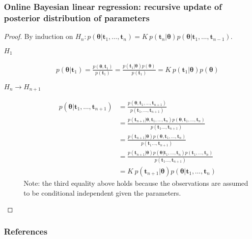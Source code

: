 \documentclass{beamer}
\begin{document}
\begin{frame}
    \frametitle{Online Bayesian linear regression: recursive update of posterior distribution of parameters}
	\tiny
	\begin{proof}
		By induction on $H_n: p(\boldsymbol{\theta}|\mathbf{t}_1,\ldots,\mathbf{t}_n)=K\ p(\mathbf{t}_n|\boldsymbol{\theta})p(\boldsymbol{\theta}|\mathbf{t}_1,\ldots,\mathbf{t}_{n-1})$.
		\begin{description}
			\item[$H_1$]
				\begin{align*}
					p(\boldsymbol{\theta}|\mathbf{t}_1)=\frac{p(\boldsymbol{\theta},\mathbf{t}_1)}{p(\mathbf{t}_1)}=\frac{p(\mathbf{t}_1|\boldsymbol{\theta})p(\boldsymbol{\theta})}{p(\mathbf{t}_1)}=K\ p(\mathbf{t}_1|\boldsymbol{\theta})p(\boldsymbol{\theta})
				\end{align*}
			\item[$H_n\rightarrow H_{n+1}$]
				\begin{align*}
					p(\boldsymbol{\theta}|\mathbf{t}_1,\ldots,\mathbf{t}_{n+1})&=\frac{p(\boldsymbol{\theta},\mathbf{t}_1,\ldots,\mathbf{t}_{n+1})}{p(\mathbf{t}_1,\ldots,\mathbf{t}_{n+1})}\\
                                                                               &=\frac{p(\mathbf{t}_{n+1}|\boldsymbol{\theta},\mathbf{t}_1,\ldots,\mathbf{t}_n)p(\boldsymbol{\theta},\mathbf{t}_1,\ldots,\mathbf{t}_n)}{p(\mathbf{t}_1\ldots,\mathbf{t}_{n+1})}\\
                                                                               &=\frac{p(\mathbf{t}_{n+1}|\boldsymbol{\theta})p(\boldsymbol{\theta},\mathbf{t}_1,\ldots,\mathbf{t}_n)}{p(\mathbf{t}_1\ldots,\mathbf{t}_{n+1})}\\
                                                                               &=\frac{p(\mathbf{t}_{n+1}|\boldsymbol{\theta})p(\boldsymbol{\theta}|\mathbf{t}_1,\ldots,\mathbf{t}_n)p(\mathbf{t}_1,\ldots,\mathbf{t}_n)}{p(\mathbf{t}_1\ldots,\mathbf{t}_{n+1})}\\
                                                                               &=K\ p(\mathbf{t}_{n+1}|\boldsymbol{\theta})p(\boldsymbol{\theta}|\mathbf{t}_1,\ldots,\mathbf{t}_n)
				\end{align*}
				Note: the third equality above holds because the observations are assumed to be conditional independent given the parameters.
		\end{description}
	\end{proof}
	\normalsize
\end{frame}

\begin{frame}
    \frametitle{References}

    \tiny{
        
        
    }
\end{frame}
\end{document}
